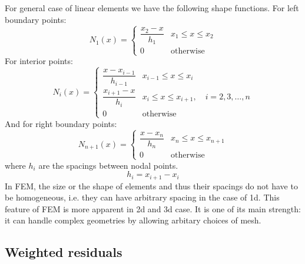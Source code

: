 \documentclass[a4paper,12pt]{article} %
\begin{document}
For general case of linear elements we have the following shape functions. For left
boundary points:
\begin{equation}
N_{1}(x) = \begin{cases}
\dfrac{x_{2} - x}{h_1} & x_{1} \leq x \leq x_{2} \\[10pt]
0                     & \text{otherwise}
\end{cases}
\end{equation}
%
For interior points:
%
\begin{equation}
N_{i}(x) = \begin{cases}
\dfrac{x - x_{i-1}}{h_{i-1}} & x_{i-1} \leq x \leq x_{i} \\[10pt]
\dfrac{x_{i+1} - x}{h_{i}} & x_{i} \leq x \leq x_{i+1},\quad i=2,3,\ldots,n \\[10pt]
0                     & \text{otherwise}
\end{cases}
\end{equation}
%
And for right boundary points:
%
\begin{equation}
N_{n+1}(x) = \begin{cases}
\dfrac{x - x_{n}}{h_{n}} & x_{n} \leq x \leq x_{n+1} \\[10pt]
0                     & \text{otherwise}
\end{cases}
\end{equation}
%
where $h_{i}$ are the spacings between nodal points.
%
\begin{equation}
h_{i} = x_{i+1} - x_{i}
\end{equation}
%
In FEM, the size or the shape of elements and thus their
spacings do not have to be homogeneous, i.e. they can have arbitrary spacing
in the case of 1d.
This feature of FEM is more apparent in 2d and 3d case.
It is one of its main strength: it can handle
complex geometries by allowing arbitary choices of mesh.

\subsection{Weighted residuals}
\end{document}
